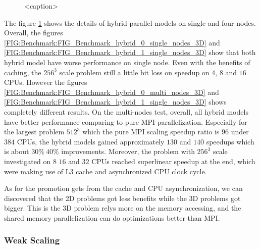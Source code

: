 \begin{figure}
{    \label{FIG:Benchmark:FIG_Benchmark_hybrid_0_multi_nodes_3D}
  }
  \hspace{0em} 
  \caption{<caption>}
  \label{FIG:Benchmark:Hybrid_Single_Four_Node_3D}
\end{figure}
The figure \ref{FIG:Benchmark:Hybrid_Single_Four_Node_3D} shows the details of hybrid parallel models on single and four nodes.
Overall, the figures \ref{FIG:Benchmark:FIG_Benchmark_hybrid_0_single_nodes_3D} and \ref{FIG:Benchmark:FIG_Benchmark_hybrid_1_single_nodes_3D}
show that both hybrid model have worse performance on single node. Even with the benefits of caching, the $256^3$ scale problem still 
a little bit loss on speedup on $4$, $8$ and $16$ CPUs.
However the figures \ref{FIG:Benchmark:FIG_Benchmark_hybrid_0_multi_nodes_3D} and \ref{FIG:Benchmark:FIG_Benchmark_hybrid_1_single_nodes_3D} 
shows completely different results.
On the multi-nodes test, overall, all hybrid models have better performance comparing to pure MPI parallelization.
Especially for the largest problem $512^3$ which the pure MPI scaling speedup ratio is $96$ under $384$ CPUs, the 
hybrid models gained approximately $130$ and $140$ speedups which is about $30\% ~ 40\%$ improvements.
Moreover, the problem with $256^3$ scale investigated on $8$ $16$ and $32$ CPUs reached superlinear speedup at the end,
which were making use of L3 cache and asynchronized CPU clock cycle.

As for the promotion gets from the cache and CPU asynchronization, we can discovered that the 2D problems got less benefits 
while the 3D problems got bigger.
This is the 3D problem relys more on the memory accessing, and the shared memory parallelization can do optimizations better than MPI.

\subsubsection{Weak Scaling}


